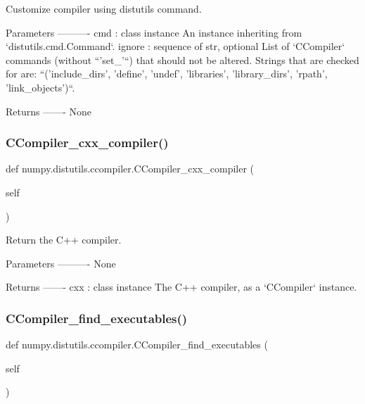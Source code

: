 \begin{DoxyVerb}Customize compiler using distutils command.

Parameters
----------
cmd : class instance
    An instance inheriting from `distutils.cmd.Command`.
ignore : sequence of str, optional
    List of `CCompiler` commands (without ``'set_'``) that should not be
    altered. Strings that are checked for are:
    ``('include_dirs', 'define', 'undef', 'libraries', 'library_dirs',
    'rpath', 'link_objects')``.

Returns
-------
None\end{DoxyVerb}
 \mbox{\label{namespacenumpy_1_1distutils_1_1ccompiler_a8c592aae01388179193dcf05d400f4a9}} 
\subsubsection{\texorpdfstring{C\+Compiler\+\_\+cxx\+\_\+compiler()}{CCompiler\_cxx\_compiler()}}
{\footnotesize\ttfamily def numpy.\+distutils.\+ccompiler.\+C\+Compiler\+\_\+cxx\+\_\+compiler (\begin{DoxyParamCaption}\item[{}]{self }\end{DoxyParamCaption})}

\begin{DoxyVerb}Return the C++ compiler.

Parameters
----------
None

Returns
-------
cxx : class instance
    The C++ compiler, as a `CCompiler` instance.\end{DoxyVerb}
 \mbox{\label{namespacenumpy_1_1distutils_1_1ccompiler_af6507e9e00649b8f91a963f0e919d835}} 
\subsubsection{\texorpdfstring{C\+Compiler\+\_\+find\+\_\+executables()}{CCompiler\_find\_executables()}}
{\footnotesize\ttfamily def numpy.\+distutils.\+ccompiler.\+C\+Compiler\+\_\+find\+\_\+executables (\begin{DoxyParamCaption}\item[{}]{self }\end{DoxyParamCaption})}



